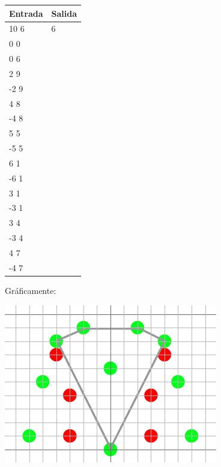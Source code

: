\begin{center}
    \begin{tabular}{| l | l |}
    \hline
    Entrada & Salida \\ \hline
	10 6 & 6 \\
	0 0 & \\
	0 6 & \\
	2 9 & \\
	-2 9 & \\
	4 8 & \\
	-4 8 & \\
	5 5 & \\
	-5 5 & \\
	6 1 & \\
	-6 1 & \\
	3 1 & \\
	-3 1 & \\
	3 4 & \\
	-3 4 & \\
	4 7 & \\
	-4 7 & \\
	\hline
    \end{tabular}
\end{center}

Gráficamente:

\includegraphics[scale=0.5]{img/ej3c4.png}
